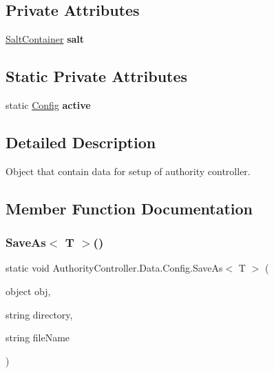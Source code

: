\subsection*{Private Attributes}
\begin{DoxyCompactItemize}
\item 
\mbox{\label{class_authority_controller_1_1_data_1_1_config_a1cd19a4d5ffc9b876b1658759fcef8b5}} 
\mbox{\hyperlink{class_authority_controller_1_1_data_1_1_salt_container}{Salt\+Container}} {\bfseries salt}
\end{DoxyCompactItemize}
\subsection*{Static Private Attributes}
\begin{DoxyCompactItemize}
\item 
\mbox{\label{class_authority_controller_1_1_data_1_1_config_ad383f87102c61bc2cb19ba36860a20f4}} 
static \mbox{\hyperlink{class_authority_controller_1_1_data_1_1_config}{Config}} {\bfseries active}
\end{DoxyCompactItemize}


\subsection{Detailed Description}
Object that contain data for setup of authority controller. 



\subsection{Member Function Documentation}
\mbox{\label{class_authority_controller_1_1_data_1_1_config_a96c731587b3eda94608691423dcc0d65}} 
\subsubsection{\texorpdfstring{Save\+As$<$ T $>$()}{SaveAs< T >()}}
{\footnotesize\ttfamily static void Authority\+Controller.\+Data.\+Config.\+Save\+As$<$ T $>$ (\begin{DoxyParamCaption}\item[{object}]{obj,  }\item[{string}]{directory,  }\item[{string}]{file\+Name }\end{DoxyParamCaption})\hspace{0.3cm}{\ttfamily [static]}}



